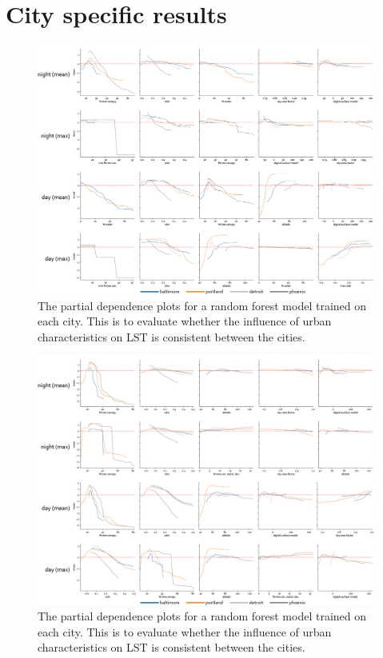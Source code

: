 \documentclass[final,3p,times,twocolumn,sort&compress]{elsarticle}
\begin{document}
\newpage
\section{City specific results}
\label{ss:city}
\begin{figure}[h]
    \centering
    \includegraphics[width=\linewidth]{fig/report/pdp_cities_500.png}
    \caption[City specific partial dependence plots]{
    The partial dependence plots for a random forest model trained on each city.
    This is to evaluate whether the influence of urban characteristics on LST is consistent between the cities.
    }
    \label{fig:cities_500}
\end{figure}

\begin{figure}[h]
    \centering
    \includegraphics[width=\linewidth]{fig/report/pdp_cities_100.png}
    \caption[City specific partial dependence plots]{
    The partial dependence plots for a random forest model trained on each city.
    This is to evaluate whether the influence of urban characteristics on LST is consistent between the cities.
    }
    \label{fig:cities_100}
\end{figure}
\end{document}
